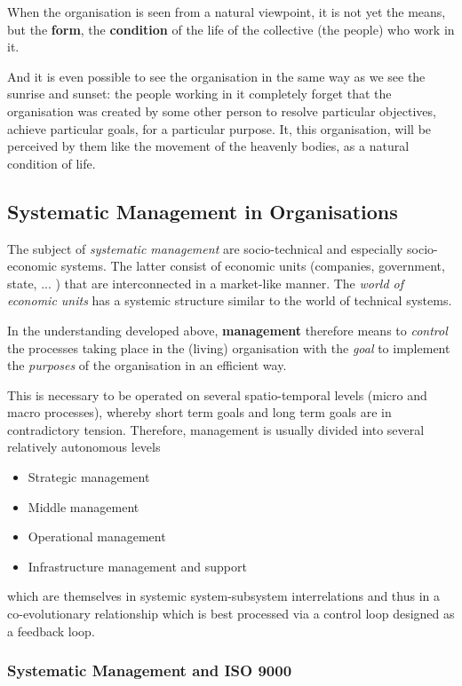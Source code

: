 \documentclass[11pt,a4paper]{article}
\begin{document}
When the organisation is seen from a natural viewpoint, it is not yet the
means, but the \textbf{form}, the \textbf{condition} of the life of the
collective (the people) who work in it.

And it is even possible to see the organisation in the same way as we see the
sunrise and sunset: the people working in it completely forget that the
organisation was created by some other person to resolve particular
objectives, achieve particular goals, for a particular purpose. It, this
organisation, will be perceived by them like the movement of the heavenly
bodies, as a natural condition of life.

\subsection{Systematic Management in Organisations}

The subject of \emph{systematic management} are socio-technical and especially
socio-economic systems. The latter consist of economic units (companies,
government, state, ... ) that are interconnected in a market-like manner. The
\emph{world of economic units} has a systemic structure similar to the world
of technical systems.

In the understanding developed above, \textbf{management} therefore means to
\emph{control} the processes taking place in the (living) organisation with
the \emph{goal} to implement the \emph{purposes} of the organisation in an
efficient way.

This is necessary to be operated on several spatio-temporal levels (micro and
macro processes), whereby short term goals and long term goals are in 
contradictory tension. Therefore, management is usually divided into several
relatively autonomous levels
\begin{itemize}
\item Strategic management
\item Middle management
\item Operational management
\item Infrastructure management and support
\end{itemize}
which are themselves in systemic system-subsystem interrelations and thus in a
co-evolutio\-nary relationship which is best processed via a control loop
designed as a feedback loop.

\subsubsection{Systematic Management and ISO 9000}
\end{document}
